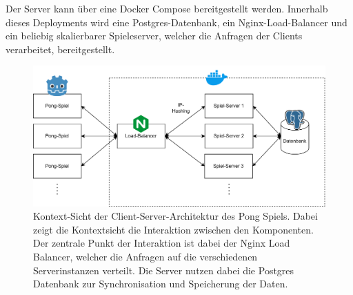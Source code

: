 \documentclass[
]{article}
\begin{document}
Der Server kann über eine Docker Compose bereitgestellt werden.
Innerhalb dieses Deployments wird eine Postgres-Datenbank, 
ein Nginx-Load-Balancer und ein beliebig skalierbarer Spieleserver, welcher die Anfragen der Clients verarbeitet, bereitgestellt.

\begin{figure}[H]
	\centering
	\includegraphics[width=\textwidth ]{resources/Client-Server.drawio.png}
	\caption{Kontext-Sicht der Client-Server-Architektur des Pong Spiels. Dabei zeigt die Kontextsicht die Interaktion zwischen den Komponenten. Der zentrale Punkt der Interaktion ist dabei der Nginx Load Balancer, welcher die Anfragen auf die verschiedenen Serverinstanzen verteilt.
  Die Server nutzen dabei die Postgres Datenbank zur Synchronisation und Speicherung der Daten.       }
	\label{fig:clientserver}
\end{figure}
\end{document}
